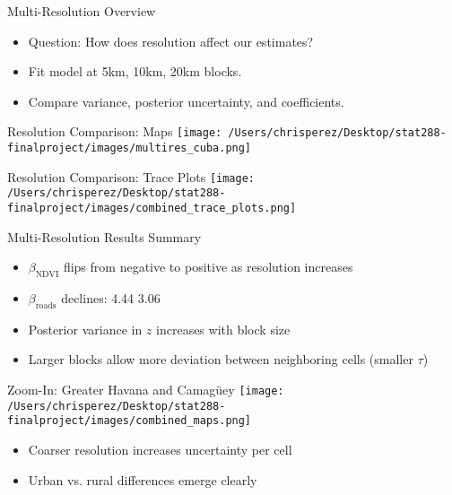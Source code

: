 \documentclass{beamer}
\begin{document}
\begin{frame}{Multi-Resolution Overview}
  \begin{itemize}
    \item Question: How does resolution affect our estimates?
    \item Fit model at 5km, 10km, 20km blocks.
    \item Compare variance, posterior uncertainty, and coefficients.
  \end{itemize}
  \end{frame}
  
\begin{frame}{Resolution Comparison: Maps}
    \texttt{[image: /Users/chrisperez/Desktop/stat288-finalproject/images/multires\_cuba.png]}
\end{frame}


\begin{frame}{Resolution Comparison: Trace Plots}
    \texttt{[image: /Users/chrisperez/Desktop/stat288-finalproject/images/combined\_trace\_plots.png]}
\end{frame}


  \begin{frame}{Multi-Resolution Results Summary}
    \begin{itemize}
      \item $\beta_{\text{NDVI}}$ flips from negative to positive as resolution increases
      \item $\beta_{\text{roads}}$ declines: 4.44 \textrightarrow{} 3.06
      \item Posterior variance in $z$ increases with block size
      \item Larger blocks allow more deviation between neighboring cells (smaller $\tau$)
    \end{itemize}
    \end{frame}
    
    

\begin{frame}{Zoom-In: Greater Havana and Camagüey}
\texttt{[image: /Users/chrisperez/Desktop/stat288-finalproject/images/combined\_maps.png]}
\begin{itemize}
  \item Coarser resolution increases uncertainty per cell
  \item Urban vs. rural differences emerge clearly
\end{itemize}
\end{frame}
\end{document}

